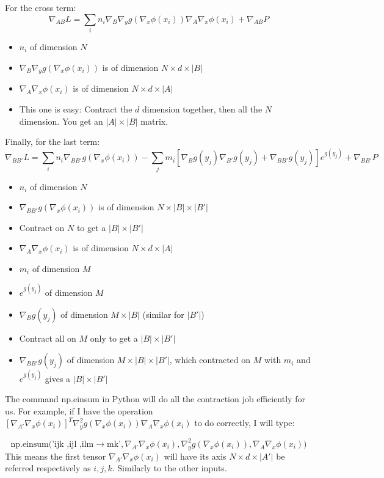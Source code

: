 \documentclass{article}
\theoremstyle{definition}
\theoremstyle{remark}
\newcommand{\1}{\mathbbm{1}}
\begin{document}
For the cross term:
\[
\nabla_{A B} L = \sum_i n_i \nabla_{B}\nabla_y g(\nabla_x \phi(x_i)) \nabla_{A} \nabla_x \phi(x_i) + \nabla_{A B} P\]
\begin{itemize}
\item  $n_i$ of dimension $N$
\item  $\nabla_{B}\nabla_y g(\nabla_x \phi(x_i))$ is of dimension $N \times d \times|B|$
\item $\nabla_{A} \nabla_x \phi(x_i)$ is of dimension $N \times d \times |A| $
 \item This one is easy: Contract the $d$ dimension together, then all the $N$ dimension. You get an $|A| \times |B|$ matrix.
\end{itemize}
Finally, for the last term:
\[\nabla_{B B'} L = \sum_i n_i \nabla_{B B'} g(\nabla_x \phi(x_i)) - \sum_j m_i \left[ \nabla_{B} g(y_j)\nabla_{B'} g(y_j)+ \nabla_{B B'} g(y_j)\right]e^{g(y_j)} + \nabla_{B B'} P\]
\begin{itemize}
\item  $n_i$ of dimension $N$
\item  $\nabla_{B B'} g(\nabla_x \phi(x_i)) $ is of dimension $N \times |B| \times|B'|$
\item Contract on $N$ to get a $|B| \times |B'|$
\item $\nabla_{A} \nabla_x \phi(x_i)$ is of dimension $N \times d \times |A| $
\item  $m_i$ of dimension $M$
\item $e^{g(y_j)}$ of dimension $M$
\item  $\nabla_{B} g(y_j)$ of dimension $M \times |B|$ (similar for $|B'|$)
\item Contract all on $M$ only to get a $|B| \times |B'|$
\item $\nabla_{B B'} g(y_j)$ of dimension $M \times |B| \times |B'|$, which contracted on $M$ with $m_i$ and $e^{g(y_j)}$ gives a $|B| \times |B'|$
\end{itemize}

The command np.einsum in Python will do all the contraction job efficiently for us. For example, if I have the operation $[\nabla_{A'} \nabla_x \phi(x_i)]^T \nabla_y^2 g (\nabla_x \phi(x_i)) \nabla_{A} \nabla_x \phi(x_i)$ to do correctly, I will type:

\[
\text{np.einsum('ijk ,ijl ,ilm} \rightarrow \text{mk'},\nabla_{A'} \nabla_x \phi(x_i),\nabla_y^2 g (\nabla_x \phi(x_i)),\nabla_{A} \nabla_x \phi(x_i))
\]
This means the first tensor $\nabla_{A'} \nabla_x \phi(x_i)$ will have its axis $N \times d \times |A'|$ be referred respectively as $i,j,k$. Similarly to the other inputs.
\end{document}
